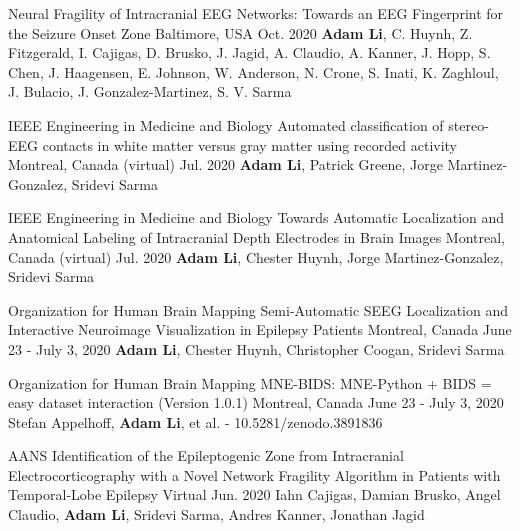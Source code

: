 \begin{cventries}
    {Neural Fragility of Intracranial EEG Networks: Towards an EEG Fingerprint for the Seizure Onset Zone}
    {Baltimore, USA}
    {Oct. 2020}
    {\textbf{Adam Li}, C. Huynh, Z. Fitzgerald, I. Cajigas, D. Brusko, J. Jagid, A. Claudio, A. Kanner, J. Hopp, S. Chen, J. Haagensen, E. Johnson, W. Anderson, N. Crone, S. Inati, K. Zaghloul, J. Bulacio, J. Gonzalez-Martinez, S. V. Sarma}
    {}
    \vspace{-0.4cm}  
    
  \cvpresentation
    {IEEE Engineering in Medicine and Biology}%
    {Automated classification of stereo-EEG contacts in white matter versus gray matter using recorded activity} %
    {Montreal, Canada (virtual)} %
    {Jul. 2020} %
    {\textbf{Adam Li}, Patrick Greene, Jorge Martinez-Gonzalez, Sridevi Sarma}%
    {}
    \vspace{-0.4cm}   
    
  \cvpresentation
    {IEEE Engineering in Medicine and Biology}%
    {Towards Automatic Localization and Anatomical Labeling of Intracranial Depth Electrodes in Brain Images} %
    {Montreal, Canada (virtual)} %
    {Jul. 2020} %
    {\textbf{Adam Li}, Chester Huynh, Jorge Martinez-Gonzalez, Sridevi Sarma}%
    {}
    \vspace{-0.4cm}    
    
  \cvpresentation
    {Organization for Human Brain Mapping}%
    {Semi-Automatic SEEG Localization and Interactive Neuroimage Visualization in Epilepsy Patients} %
    {Montreal, Canada} %
    {June 23 - July 3, 2020} %
    {\textbf{Adam Li}, Chester Huynh, Christopher Coogan, Sridevi Sarma}%
    {}
    \vspace{-0.4cm}    
    
  \cvpresentation
    {Organization for Human Brain Mapping}%
    {MNE-BIDS: MNE-Python + BIDS = easy dataset interaction (Version 1.0.1)} %
    {Montreal, Canada} %
    {June 23 - July 3, 2020} %
    {Stefan Appelhoff, \textbf{Adam Li}, et al. - 10.5281/zenodo.3891836}%
    {}
    \vspace{-0.4cm}    
    
    \cvpresentation
    {AANS}%
    {Identification of the Epileptogenic Zone from Intracranial Electrocorticography with a Novel Network Fragility Algorithm in Patients with Temporal-Lobe Epilepsy} %
    {Virtual} %
    {Jun. 2020} %
    {Iahn Cajigas, Damian Brusko, Angel Claudio, \textbf{Adam Li}, Sridevi Sarma, Andres Kanner, Jonathan Jagid}%
    {}
    \vspace{-0.4cm}  
    

\end{cventries}
